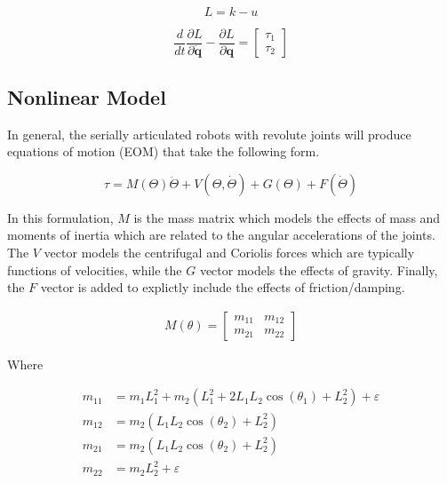 \documentclass[journal]{IEEEtran}
\begin{document}
\begin{equation}
  L = k - u
\end{equation}

\begin{equation}
\frac{d}{d t} \frac{\partial L}{\partial \dot{\boldsymbol{q}}}-\frac{\partial L}{\partial \boldsymbol{q}}=\left[\begin{array}{l}
\tau_{1} \\
\tau_{2}
\end{array}\right]
\end{equation}


\subsection{Nonlinear Model}
In general, the serially articulated robots with revolute joints will produce equations of motion (EOM) that take the following form.

\begin{equation}
  \tau = M(\Theta)\ddot{\Theta} + V(\Theta, \dot{\Theta}) + G(\Theta) + F(\dot{\Theta})
\end{equation}


In this formulation, $M$ is the mass matrix which models the effects of mass and moments of inertia which are related to the angular accelerations of the joints. The $V$ vector models the centrifugal and Coriolis forces which are typically functions of velocities, while the $G$ vector models the effects of gravity. Finally, the $F$ vector is added to explictly include the effects of friction/damping.

\begin{equation}
\begin{aligned}
M(\theta)=\left[\begin{array}{ll}
 m_{11} & m_{12}  \\
 m_{21} & m_{22} \end{array}\right]
\end{aligned}
\end{equation}

Where

\begin{equation*}
\begin{aligned}
  m_{11} & = m_{1} L_{1}^{2}+m_{2}\left(L_{1}^{2}+2 L_{1} L_{2} \cos \left(\theta_{1}\right)+L_{2}^{2}\right) + \varepsilon \\
  m_{12} & = m_{2}\left(L_{1} L_{2} \cos \left(\theta_{2}\right)+L_{2}^{2}\right) \\
  m_{21} & = m_{2}\left(L_{1} L_{2} \cos \left(\theta_{2}\right)+L_{2}^{2}\right)\\
  m_{22} & = m_{2} L_{2}^{2}+\varepsilon
\end{aligned}
\end{equation*}
\end{document}
